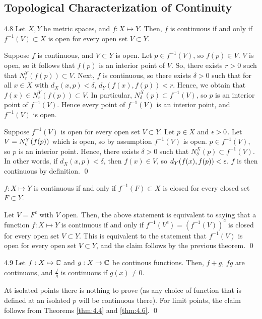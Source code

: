 \subsection{Topological Characterization of Continuity}
\begin{theorem}{}{4.8}
    Let $X, Y$ be metric spaces, and $f: X \mapsto Y$. Then, $f$ is continuous if and only if $f^{-1}(V) \subset X$ is open for every open set $V \subset Y$.
\end{theorem}
\begin{nproof}
    \boxed{\implies} Suppose $f$ is continuous, and $V \subset Y$ is open. Let $p \in f^{-1}(V)$, so $f(p) \in V$. $V$ is open, so it follows that $f(p)$ is an interior point of $V$. So, there exists $r > 0$ such that $N_r^Y(f(p)) \subset V$. Next, $f$ is continuous, so there exists $\delta > 0$ such that for all $x \in X$ with $d_X(x, p) < \delta$, $d_Y(f(x), f(p)) < r$. Hence, we obtain that $f(x) \in N_r^Y(f(p)) \subset V$. In particular, $N_\delta^X(p) \subset f^{-1}(V)$, so $p$ is an interior point of $f^{-1}(V)$. Hence every point of $f^{-1}(V)$ is an interior point, and $f^{-1}(V)$ is open.

    \boxed{\impliedby} Suppose $f^{-1}(V)$ is open for every open set $V \subset Y$. Let $p \in X$ and $\epsilon > 0$. Let $V = N_\epsilon^Y(f(p))$ which is open, so by assumption $f^{-1}(V)$ is open. $p \in f^{-1}(V)$, so $p$ is an interior point. Hence, there exists $\delta > 0$ such that $N_\delta^X(p) \subset f^{-1}(V)$. In other words, if $d_X(x, p) < \delta$, then $f(x) \in V$, so $d_Y(f(x), f(p)) < \epsilon$. $f$ is then continuous by definition. \qed
\end{nproof}

\begin{ncorollary}{}{}
    $f: X \mapsto Y$ is continuous if and only if $f^{-1}(F) \subset X$ is closed for every closed set $F \subset Y$.
\end{ncorollary}
\begin{nproof}
    Let $V = F^c$ with $V$ open. Then, the above statement is equivalent to saying that a function $f: X \mapsto Y$ is continuous if and only if $f^{-1}(V^c) = \left(f^{-1}(V)\right)^c$ is closed for every open set $V \subset Y$. This is equivalent to the statement that $f^{-1}(V)$ is open for every open set $V \subset Y$, and the claim follows by the previous theorem. \qed
\end{nproof}

\begin{theorem}{}{4.9}
    Let $f: X \mapsto \mathbb{C}$ and $g: X \mapsto \mathbb{C}$ be continous functions. Then, $f+g$, $fg$ are continuous, and $\frac{f}{g}$ is continuous if $g(x) \neq 0$. 
\end{theorem}
\begin{nproof}
    At isolated points there is nothing to prove (as any choice of function that is defined at an isolated $p$ will be continuous there). For limit points, the claim follows from Theorems \ref{thm:4.4} and \ref{thm:4.6}. \qed
\end{nproof}

